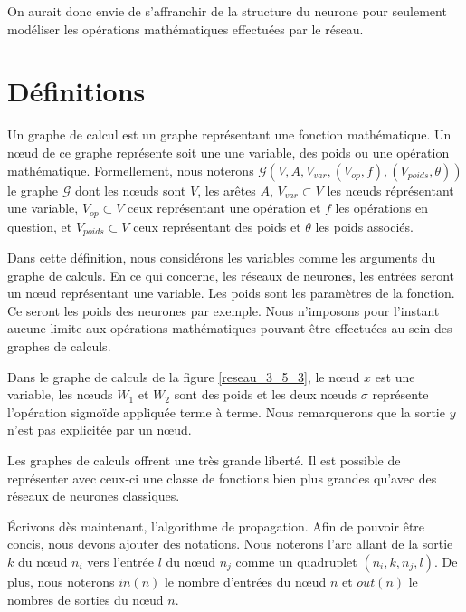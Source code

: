 On aurait donc envie de s'affranchir de la structure du neurone pour seulement modéliser les opérations mathématiques effectuées par le réseau.

\section{Définitions}

\begin{definition}
Un graphe de calcul est un graphe représentant une fonction mathématique. Un n\oe{}ud de ce graphe représente soit une une variable, des poids ou une opération mathématique. Formellement, nous noterons $\mathcal{G}(V, A, V_{var}, (V_{op}, f), (V_{poids}, \theta))$ le graphe $\mathcal{G}$ dont les n\oe{}uds sont $V$, les arêtes $A$, $V_{var} \subset V$ les n\oe{}uds réprésentant une variable, $V_{op} \subset V$ ceux représentant une opération et $f$ les opérations en question, et $V_{poids} \subset V$ ceux représentant des poids et $\theta$ les poids associés.
\end{definition}

Dans cette définition, nous considérons les variables comme les arguments du graphe de calculs. En ce qui concerne, les réseaux de neurones, les entrées seront un n\oe{}ud représentant une variable. Les poids sont les paramètres de la fonction. Ce seront les poids des neurones par exemple. Nous n'imposons pour l'instant aucune limite aux opérations mathématiques pouvant être effectuées au sein des graphes de calculs.

Dans le graphe de calculs de la figure \ref{reseau_3_5_3}, le n\oe{}ud $x$ est une variable, les n\oe{}uds $W_1$ et $W_2$ sont des poids et les deux n\oe{}uds $\sigma$ représente l'opération sigmoïde appliquée terme à terme. Nous remarquerons que la sortie $y$ n'est pas explicitée par un n\oe{}ud. 

Les graphes de calculs offrent une très grande liberté. Il est possible de représenter avec ceux-ci une classe de fonctions bien plus grandes qu'avec des réseaux de neurones classiques.

Écrivons dès maintenant, l'algorithme de propagation. Afin de pouvoir être concis, nous devons ajouter des notations. Nous noterons l'arc allant de la sortie $k$ du n\oe{}ud $n_i$ vers l'entrée $l$ du n\oe{}ud $n_j$ comme un quadruplet $(n_i, k, n_j, l)$. De plus, nous noterons $in(n)$ le nombre d'entrées du n\oe{}ud $n$ et $out(n)$ le nombres de sorties du n\oe{}ud $n$.

